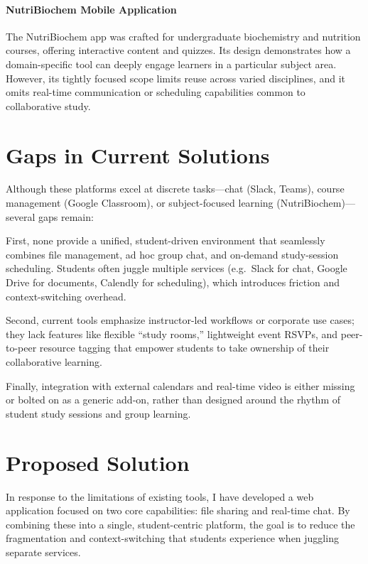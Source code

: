 \paragraph{NutriBiochem Mobile Application}\cite{NutriBiochem}  
The NutriBiochem app was crafted for undergraduate biochemistry and nutrition courses, offering interactive content and quizzes.  Its design demonstrates how a domain-specific tool can deeply engage learners in a particular subject area.  However, its tightly focused scope limits reuse across varied disciplines, and it omits real-time communication or scheduling capabilities common to collaborative study.

\section{Gaps in Current Solutions}

Although these platforms excel at discrete tasks—chat (Slack, Teams), course management (Google Classroom), or subject-focused learning (NutriBiochem)—several gaps remain:

First, none provide a unified, student-driven environment that seamlessly combines file management, ad hoc group chat, and on-demand study-session scheduling. Students often juggle multiple services (e.g.\ Slack for chat, Google Drive for documents, Calendly for scheduling), which introduces friction and context-switching overhead.

Second, current tools emphasize instructor-led workflows or corporate use cases; they lack features like flexible “study rooms,” lightweight event RSVPs, and peer-to-peer resource tagging that empower students to take ownership of their collaborative learning.

Finally, integration with external calendars and real-time video is either missing or bolted on as a generic add-on, rather than designed around the rhythm of student study sessions and group learning.

\section{Proposed Solution}

In response to the limitations of existing tools, I have developed a web application focused on two core capabilities: file sharing and real-time chat.  By combining these into a single, student-centric platform, the goal is to reduce the fragmentation and context-switching that students experience when juggling separate services.

